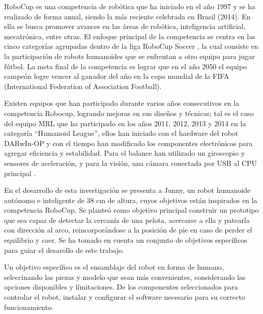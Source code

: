 RoboCup \cite{robotcup} es una competencia de robótica que ha iniciado en el año 1997 y se ha realizado de forma anual, siendo la más reciente celebrada en Brasil (2014). En ella se busca promover avances en las áreas de robótica, inteligencia artificial, mecatrónica, entre otras. El enfoque principal de la competencia se centra en las cinco categorías agrupadas dentro de la liga RoboCup Soccer \cite{robotcupsoccer}, la cual consiste en la participación de robots humanoides que se enfrentan a otro equipo para jugar fútbol. La meta final de la competencia es lograr que en el año 2050 el equipo campeón logre vencer al ganador del año en la copa mundial de la FIFA (International Federation of Association Football).

Existen equipos que han participado durante varios años consecutivos en la competencia Robocup, logrando mejoras en sus diseños y técnicas; tal es el caso del equipo MRL que ha participado en los años 2011, 2012, 2013 y 2014 en la categoría “Humanoid League”, ellos han iniciado con el hardware del robot DARwIn-OP y con el tiempo han modificado los componentes electrónicos para agregar eficiencia y estabilidad. Para el balance han utilizado un giroscopio y sensores de aceleración, y para la visión, una cámara conectada por USB al CPU principal \cite{paper1}.

 

En el desarrollo de esta investigaci\'on se presenta a Junny, un robot humanoide aut\'onomo e inteligente de 38 cm de altura, cuyos objetivos están inspirados en la competencia RoboCup. Se planteó como objetivo principal construir un prototipo que sea capaz de detectar la cercanía de una pelota, acercarse a ella y patearla con direcci\'on al arco, reincorpor\'andose a la posici\'on de pie en caso de perder el equilibrio y caer. Se ha tomado en cuenta un conjunto de objetivos específicos para guiar el desarollo de este trabajo. %

Un objetivo espec\'ifico es el ensamblaje del robot en forma de humano, seleccinando las piezas y modelo que sean más convenientes, considerando las opciones disponibles y límitaciones. De los componentes seleccionados para controlar el robot, instalar y configurar el software necesario para su correcto funcionamiento.

